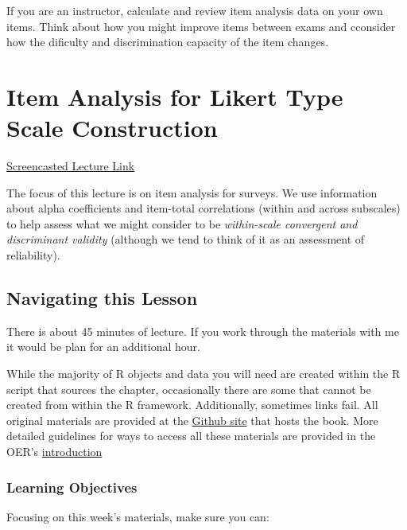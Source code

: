 \documentclass[
  english,
]{book}
\begin{document}
If you are an instructor, calculate and review item analysis data on your own items. Think about how you might improve items between exams and cconsider how the dificulty and discrimination capacity of the item changes.

\hypertarget{ItemAnalSurvey}{%
\chapter{Item Analysis for Likert Type Scale Construction}\label{ItemAnalSurvey}}

\href{https://spu.hosted.panopto.com/Panopto/Pages/Viewer.aspx?pid=09cc7469-de42-4288-ad39-ad9e01650656}{Screencasted Lecture Link}

The focus of this lecture is on item analysis for surveys. We use information about alpha coefficients and item-total correlations (within and across subscales) to help assess what we might consider to be \emph{within-scale convergent and discriminant validity} (although we tend to think of it as an assessment of reliability).

\hypertarget{navigating-this-lesson-5}{%
\section{Navigating this Lesson}\label{navigating-this-lesson-5}}

There is about 45 minutes of lecture. If you work through the materials with me it would be plan for an additional hour.

While the majority of R objects and data you will need are created within the R script that sources the chapter, occasionally there are some that cannot be created from within the R framework. Additionally, sometimes links fail. All original materials are provided at the \href{https://github.com/lhbikos/ReC_Psychometrics}{Github site} that hosts the book. More detailed guidelines for ways to access all these materials are provided in the OER's \protect\hyperlink{ReCintro}{introduction}

\hypertarget{learning-objectives-5}{%
\subsection{Learning Objectives}\label{learning-objectives-5}}

Focusing on this week's materials, make sure you can:
\end{document}

